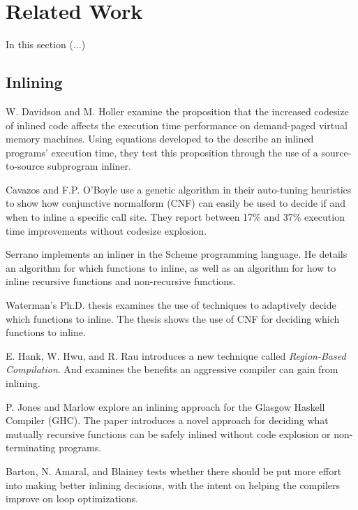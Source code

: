 
\section{Related Work}

In this section (...)

\subsection{Inlining}

W. Davidson and M. Holler \cite{SubprogInlining} examine the proposition that
the increased codesize of inlined code affects the execution time performance on
demand-paged virtual memory machines. Using equations developed to the describe
an inlined programs' execution time, they test this proposition through the use
of a source-to-source subprogram inliner.

Cavazos and F.P. O'Boyle \cite{AutoTuningJavaHeuristics} use a genetic algorithm
in their auto-tuning heuristics to show how conjunctive normalform (CNF) can
easily be used to decide if and when to inline a specific call site. They report
between 17\% and 37\% execution time improvements without codesize explosion.

Serrano \cite{InlineWhenHowSerrano} implements an inliner in the Scheme
programming language. He details an algorithm for which functions to inline, as
well as an algorithm for how to inline recursive functions and non-recursive
functions.

Waterman's Ph.D. thesis \cite{AdaptvCompilAndInlingWaterman} examines the use of
techniques to adaptively decide which functions to inline. The thesis shows the
use of CNF for deciding which functions to inline.

E. Hank, W. Hwu, and R. Rau \cite{RegionBasedCompilationIntroduction} introduces
a new technique called \textit{Region-Based Compilation}. And examines the
benefits an aggressive compiler can gain from inlining.

P. Jones and Marlow \cite{GHCPaper} explore an inlining approach for the Glasgow
Haskell Compiler (GHC). The paper introduces a novel approach for deciding what
mutually recursive functions can be safely inlined without code explosion or
non-terminating programs.

Barton, N. Amaral, and Blainey \cite{ShouldLoopOptsInfluenceInlining} tests
whether there should be put more effort into making better inlining decisions,
with the intent on helping the compilers improve on loop optimizations.

